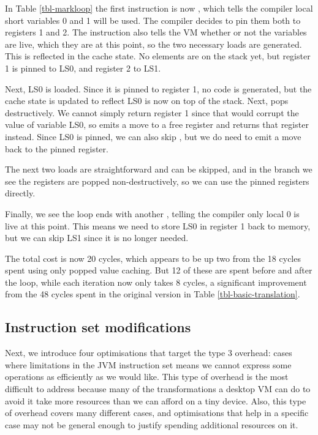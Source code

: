 In Table \ref{tbl-markloop} the first instruction is now , which tells the compiler local short variables 0 and 1 will be used. The compiler decides to pin them both to registers 1 and 2. The  instruction also tells the VM whether or not the variables are live, which they are at this point, so the two necessary loads are generated. This is reflected in the cache state. No elements are on the stack yet, but register 1 is pinned to LS0, and register 2 to LS1.

Next, LS0 is loaded. Since it is pinned to register 1, no code is generated, but the cache state is updated to reflect LS0 is now on top of the stack. Next,  pops destructively. We cannot simply return register 1 since that would corrupt the value of variable LS0, so  emits a move to a free register and returns that register instead. Since LS0 is pinned, we can also skip , but we do need to emit a move back to the pinned register.

The next two loads are straightforward and can be skipped, and in the branch we see the registers are popped non-destructively, so we can use the pinned registers directly.

Finally, we see the loop ends with another , telling the compiler only local 0 is live at this point. This means we need to store LS0 in register 1 back to memory, but we can skip LS1 since it is no longer needed.

The total cost is now 20 cycles, which appears to be up two from the 18 cycles spent using only popped value caching. But 12 of these are spent before and after the loop, while each iteration now only takes 8 cycles, a significant improvement from the 48 cycles spent in the original version in Table \ref{tbl-basic-translation}.

\subsection{Instruction set modifications}
Next, we introduce four optimisations that target the type 3 overhead: cases where limitations in the JVM instruction set means we cannot express some operations as efficiently as we would like. This type of overhead is the most difficult to address because many of the transformations a desktop VM can do to avoid it take more resources than we can afford on a tiny device. Also, this type of overhead covers many different cases, and optimisations that help in a specific case may not be general enough to justify spending additional resources on it.

